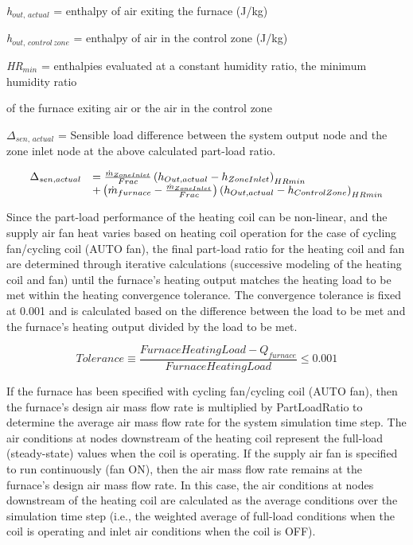 \emph{h\(_{out,\, actual}\)} = enthalpy of air exiting the furnace (J/kg)

\emph{h\(_{out,\, control\, zone}\)} = enthalpy of air in the control zone (J/kg)

\emph{HR\(_{min}\)} = enthalpies evaluated at a constant humidity ratio, the minimum humidity ratio

of the furnace exiting air or the air in the control zone

\(\Delta_{sen,\, actual}\) = Sensible load difference between the system output node and the zone inlet node at the above calculated part-load ratio.

\begin{equation}
  \begin{array}{rl}
    \Delta_{sen,actual} &= \frac{\dot{m}_{ZoneInlet}}{Frac} \PB{h_{Out,actual} - h_{ZoneInlet}}_{HRmin} \\
                           &+ \PB{\dot{m}_{furnace} - \frac{\dot{m}_{ZoneInlet}}{Frac}} \PB{h_{Out,actual} - h_{ControlZone}}_{HRmin}
  \end{array}
\end{equation}

Since the part-load performance of the heating coil can be non-linear, and the supply air fan heat varies based on heating coil operation for the case of cycling fan/cycling coil (AUTO fan), the final part-load ratio for the heating coil and fan are determined through iterative calculations (successive modeling of the heating coil and fan) until the furnace's heating output matches the heating load to be met within the heating convergence tolerance. The convergence tolerance is fixed at 0.001 and is calculated based on the difference between the load to be met and the furnace's heating output divided by the load to be met.

\begin{equation}
  Tolerance \equiv \frac{FurnaceHeatingLoad - Q_{furnace}}{FurnaceHeatingLoad} \leq 0.001
\end{equation}

If the furnace has been specified with cycling fan/cycling coil (AUTO fan), then the furnace's design air mass flow rate is multiplied by PartLoadRatio to determine the average air mass flow rate for the system simulation time step. The air conditions at nodes downstream of the heating coil represent the full-load (steady-state) values when the coil is operating. If the supply air fan is specified to run continuously (fan ON), then the air mass flow rate remains at the furnace's design air mass flow rate. In this case, the air conditions at nodes downstream of the heating coil are calculated as the average conditions over the simulation time step (i.e., the weighted average of full-load conditions when the coil is operating and inlet air conditions when the coil is OFF).

